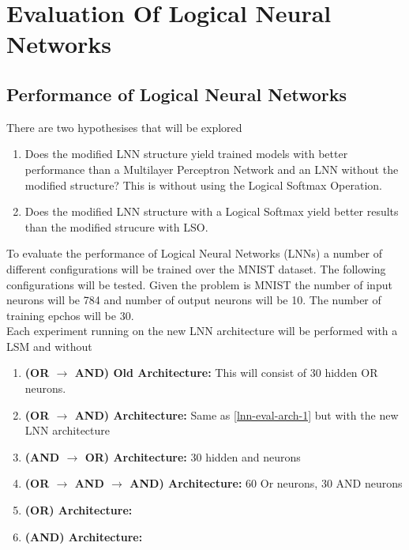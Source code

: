 \chapter{Evaluation Of Logical Neural Networks} \label{C:evaluation-lnn}
\section{Performance of Logical Neural Networks} \label{sec:lnn-eval-peformance}
There are two hypothesises that will be explored

\begin{enumerate}
	\item Does the modified LNN structure yield trained models with better performance than a Multilayer Perceptron Network and an LNN without the modified structure? This is without using the Logical Softmax Operation.
	\item Does the modified LNN structure with a Logical Softmax yield better results than the modified strucure with LSO.
\end{enumerate}

To evaluate the performance of Logical Neural Networks (LNNs) a number of different configurations will be trained over the MNIST dataset. The following configurations will be tested. Given the problem is MNIST the number of input neurons will be 784 and number of output neurons will be 10. The number of training epchos will be 30.\\

Each experiment running on the new LNN architecture will be performed with a LSM and without

\begin{enumerate}
	\item \textbf{(OR $\rightarrow$ AND) Old Architecture:} This will consist of 30 hidden OR neurons. \label{lnn-eval-arch-1}
	\item \textbf{(OR $\rightarrow$ AND) Architecture:} Same as \ref{lnn-eval-arch-1} but with the new LNN architecture \label{lnn-eval-arch-2}
	\item \textbf{(AND $\rightarrow$ OR) Architecture:} 30 hidden and neurons \label{lnn-eval-arch-3}
	\item \textbf{(OR $\rightarrow$ AND $\rightarrow$ AND) Architecture: } 60 Or neurons, 30 AND neurons\label{lnn-eval-arch-4}
	\item \textbf{(OR) Architecture:} \label{lnn-eval-arch-5}
	\item \textbf{(AND) Architecture:} \label{lnn-eval-arch-6}
\end{enumerate}


